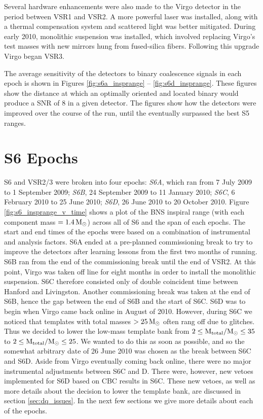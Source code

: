 Several hardware enhancements were also made to the Virgo detector in the
period between \ac{VSR1} and \ac{VSR2}. A more powerful laser was installed,
along with a thermal compensation system and scattered light was better
mitigated. During early 2010, monolithic suspension was installed, which
involved replacing Virgo's test masses with new mirrors hung from fused-silica
fibers. Following this upgrade Virgo began \ac{VSR3}. 

The average sensitivity of the detectors to binary coalescence signals in each epoch is shown
in Figures \ref{fig:s6a_insprange} -- \ref{fig:s6d_insprange}. These figures show the distance at
which an optimally oriented and located binary would produce a \ac{SNR}
of $8$ in a given detector. The figures show how the detectors were improved over the course of the run, until the eventually surpassed the best \ac{S5} ranges. 

\section{S6 Epochs}

\ac{S6} and VSR2/3 were broken into four epochs: \emph{S6A}, which ran from 7 July 2009 to 1 September 2009; \emph{S6B}, 24 September 2009 to 11 January 2010; \emph{S6C}, 6 February 2010 to 25 June 2010; \emph{S6D}, 26 June 2010 to 20 October 2010. Figure \ref{fig:s6_insprange_v_time} shows a plot of the \ac{BNS} inspiral range (with each component mass $= 1.4\,\mathrm{M_\odot}$) across all of \ac{S6} and the span of each epochs. The start and end times of the epochs were based on a combination of instrumental and analysis factors. S6A ended at a pre-planned commissioning break to try to improve the detectors after learning lessons from the first two months of running. S6B ran from the end of the commissioning break until the end of \ac{VSR2}. At this point, Virgo was taken off line for eight months in order to install the monolithic suspension. S6C therefore consisted only of double coincident time between Hanford and Livingston. Another commissioning break was taken at the end of S6B, hence the gap between the end of S6B and the start of S6C. S6D was to begin when Virgo came back online in August of 2010. However, during S6C we noticed that templates with total masses $> 25\,\mathrm{M_\odot}$ often rang off due to glitches. Thus we decided to lower the low-mass template bank from $2 \leq \mathrm{M_{total}}/\mathrm{M_\odot} \leq 35$ to $2 \leq \mathrm{M_{total}}/\mathrm{M_\odot} \leq 25$. We wanted to do this as soon as possible, and so the somewhat arbitrary date of 26 June 2010 was chosen as the break between S6C and S6D. Aside from Virgo eventually coming back online, there were no major instrumental adjustments between S6C and D. There were, however, new vetoes implemented for S6D based on \ac{CBC} results in S6C. These new vetoes, as well as more details about the decision to lower the template bank, are discussed in section \ref{sec:dq_issues}. In the next few sections we give more details about each of the epochs.

